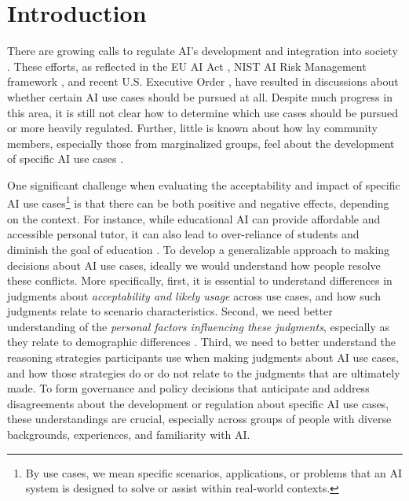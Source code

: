 \section{Introduction}
There are growing calls to regulate AI's development and integration into society \citep{pistilli2023stronger}. These efforts, as reflected in the EU AI Act \citep{AIAct_2023}, NIST AI Risk Management framework \citep{NIST_2021}, and recent U.S. Executive Order \citep{executiveorder2023}, have resulted in discussions about whether certain AI use cases should be pursued at all. Despite much progress in this area, it is still not clear how to determine which use cases should be pursued or more heavily regulated. Further, little is known about how lay community members, especially those from marginalized groups, feel about the development of specific AI use cases \citep{ada2023survey,suresh2024participation}. 

One significant challenge when evaluating the acceptability and impact of specific AI use cases\footnote{By use cases, we mean specific scenarios, applications, or problems that an AI system is designed to solve or assist within real-world contexts.} is that there can be both positive and negative effects, depending on the context\citep{mun2024participaidemocraticsurveyingframework}. For instance, while educational AI can provide affordable and accessible personal tutor, it can also lead to over-reliance of students and diminish the goal of education \cite{ChatbotTeach, zhai2024effects}. To develop a generalizable approach to making decisions about AI use cases, ideally we would understand how people resolve these conflicts. More specifically, first, it is essential to understand differences in judgments about \emph{acceptability and likely usage} across use cases, and how such judgments relate to scenario characteristics. Second, we need better understanding of the \emph{personal factors influencing these judgments}, especially as they relate to demographic differences \cite{kingsley2024investigating}. Third, we need to better understand the reasoning strategies participants use when making judgments about AI use cases, and how those strategies do or do not relate to the judgments that are ultimately made. To form governance and policy decisions that anticipate and address disagreements about the development or regulation about specific AI use cases, these understandings are crucial, especially across groups of people with diverse backgrounds, experiences, and familiarity with AI. 

